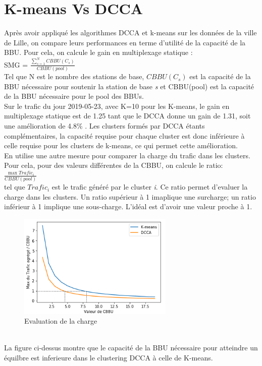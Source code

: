 \documentclass{report}
\begin{document}
\section{K-means Vs DCCA}
Après avoir appliqué les algorithmes DCCA et k-means sur les données de la ville de Lille, on compare leurs performances en terme d'utilité de la capacité de la BBU. 
Pour cela, on calcule le gain en multiplexage statique :\\
SMG = $\frac{\sum_{s=1}^N CBBU(C_{s})} {CBBU(pool)}$  \\
Tel que N est le nombre des stations de base, $CBBU(C_{s})$ est la capacité de la BBU nécessaire pour soutenir la station 
de base \emph{s} et CBBU(pool) est la capacité de la BBU nécessaire pour le pool des BBUs.\\
Sur le trafic du jour 2019-05-23, avec K=10 pour les K-means, le gain en multiplexage statique est de 1.25 tant que le DCCA 
donne un gain de 1.31, soit une amélioration de 4.8\% . Les clusters formés par DCCA étants complémentaires, la capacité requise 
pour chaque cluster est donc inférieure à celle requise pour les clusters de k-means, ce qui permet cette amélioration.\\
En utilise une autre mesure pour comparer la charge du trafic dans les clusters. Pour cela, pour des valeurs différentes 
de la CBBU, on calcule le ratio:\\
 $\frac{\max{Trafic_{i}}} {CBBU(pool)}$ 
 \\tel que $Trafic_{i}$ est le trafic généré par le cluster \emph{i}. 
Ce ratio permet d'evaluer la charge dans les clusters. Un ratio supérieur à 1 imaplique une surcharge; un ratio inférieur à 1 implique une sous-charge.
 L'idéal est d'avoir une valeur proche à 1.\\
 \begin{figure}[h]
  \centering
  \includegraphics[width=20em]{images/kmeans_vs_dcca.png}
  \caption{Evaluation de la charge}
\end{figure}\\
La figure ci-dessus montre que le capacité de la BBU nécessaire pour atteindre un équilbre est inferieure dans le clustering DCCA 
à celle de K-means. 
\end{document}
